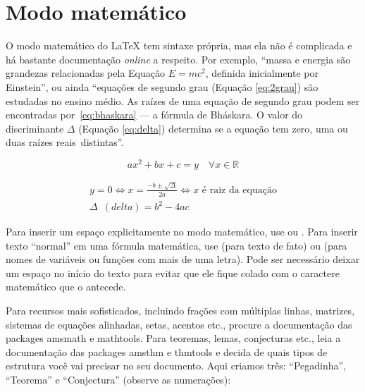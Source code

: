\enlargethispage{\baselineskip}

\section{Modo matemático}

O modo matemático do \LaTeX{} tem sintaxe própria, mas ela não é complicada e
há bastante documentação \emph{online} a respeito. Por exemplo, ``massa e
energia são grandezas relacionadas pela Equação $E=mc^2$, definida inicialmente
por Einstein'', ou ainda ``equações de segundo grau (Equação \ref{eq:2grau})
são estudadas no ensino médio. As raízes de uma equação de segundo grau podem
ser encontradas por~\eqref{eq:bhaskara} --- a fórmula de Bháskara.
O valor do discriminante $\Delta$ (Equação \ref{eq:delta}) determina se a
equação tem zero, uma ou duas raízes reais~distintas''.

\begin{equation}
  \label{eq:2grau}
  ax^2+bx+c=y \quad \forall x \in \mathbb{R}
\end{equation}

\begin{gather}
  \label{eq:bhaskara}
    y=0 \Leftrightarrow x=\frac{-b \pm \sqrt{\Delta}}{2a}
    \Leftrightarrow x \text{ é raiz da equação}\\
  \label{eq:delta}
    \Delta\enspace(\mathit{delta}) = b^2-4ac
\end{gather}

\enlargethispage{\baselineskip}

Para inserir um espaço explicitamente no modo matemático, use
 ou . Para inserir texto ``normal'' em
uma fórmula matemática, use  (para texto de fato)
ou  (para nomes de variáveis ou funções com
mais de uma letra). Pode ser necessário deixar um espaço no início do
texto para evitar que ele fique colado com o caractere matemático que
o antecede.

Para recursos mais sofisticados, incluindo frações com múltiplas linhas,
matrizes, sistemas de equações alinhadas, setas, acentos etc., procure
a documentação das packages \textsf{amsmath} e \textsf{mathtools}. Para
teoremas, lemas, conjecturas etc., leia a documentação das packages
\textsf{amsthm} e \textsf{thmtools} e decida de quais tipos de estrutura
você vai precisar no seu documento. Aqui criamos três: ``Pegadinha'',
``Teorema'' e ``Conjectura'' (observe as numerações):


